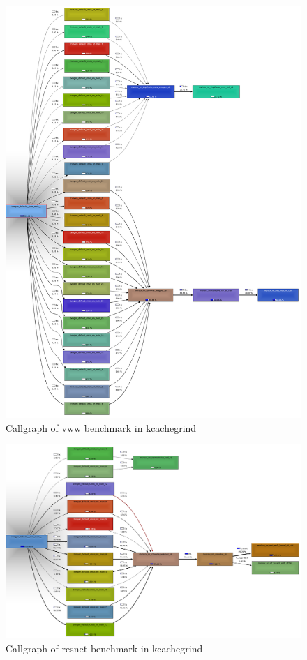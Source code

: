 \begin{figure}[ht]
    \centering
    \includegraphics[width=.9\linewidth]{figures/evaluation_vww_call_graph.png}
    \caption{Callgraph of vww benchmark in kcachegrind}
    \label{fig:evaluation_vww_call_graph}
\end{figure}

\begin{figure}[ht]
    \centering
    \includegraphics[width=.9\linewidth]{figures/evaluation_resnet_call_graph.png}
    \caption{Callgraph of resnet benchmark in kcachegrind}
    \label{fig:evaluation_resnet_call_graph}
\end{figure}